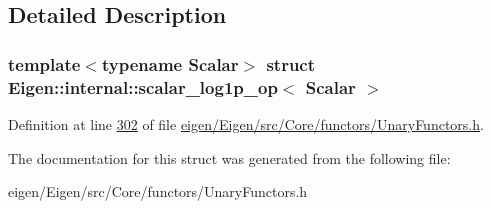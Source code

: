 \subsection{Detailed Description}
\subsubsection*{template$<$typename Scalar$>$\newline
struct Eigen\+::internal\+::scalar\+\_\+log1p\+\_\+op$<$ Scalar $>$}



Definition at line \hyperlink{eigen_2_eigen_2src_2_core_2functors_2_unary_functors_8h_source_l00302}{302} of file \hyperlink{eigen_2_eigen_2src_2_core_2functors_2_unary_functors_8h_source}{eigen/\+Eigen/src/\+Core/functors/\+Unary\+Functors.\+h}.



The documentation for this struct was generated from the following file\+:\begin{DoxyCompactItemize}
\item 
eigen/\+Eigen/src/\+Core/functors/\+Unary\+Functors.\+h\end{DoxyCompactItemize}
